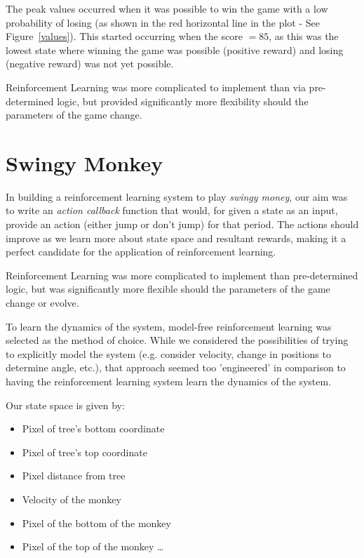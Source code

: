 \documentclass[11pt, oneside]{article}   	%
\begin{document}
The peak values occurred when it was possible to win the game with a low probability of losing (as shown in the red horizontal line in the plot - See Figure~\ref{values}). This started occurring when the score $= 85$, as this was the lowest state where winning the game was possible (positive reward) and losing (negative reward) was not yet possible.

Reinforcement Learning was more complicated to implement than via pre-determined logic, but provided significantly more flexibility should the parameters of the game change.

\section*{Swingy Monkey}
In building a reinforcement learning system to play \textit{swingy money}, our aim was to write an \textit{action callback} function that would, for given a state as an input, provide an action (either jump or don't jump) for that period. The actions should improve as we learn more about state space and resultant rewards, making it a perfect candidate for the application of reinforcement learning.

Reinforcement Learning was more complicated to implement than pre-determined logic, but was significantly more flexible should the parameters of the game change or evolve. 

To learn the dynamics of the system, model-free reinforcement learning was selected as the method of choice. While we considered the possibilities of trying to explicitly model the system (e.g. consider velocity, change in positions to determine angle, etc.), that approach seemed too 'engineered' in comparison to having the reinforcement learning system learn the dynamics of the system.

Our state space is given by:

\begin{itemize}

  \item Pixel of tree's bottom coordinate
  \item Pixel of tree's top coordinate
  \item Pixel distance from tree
  \item Velocity of the monkey
  \item Pixel of the bottom of the monkey
  \item Pixel of the top of the monkey \ldots

\end{itemize}
\end{document}
